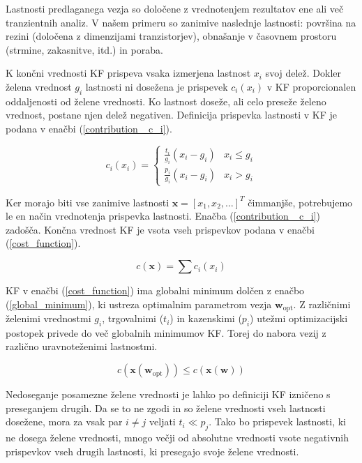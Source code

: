 \documentclass[journal,a4paper,twoside]{sty/IEEEtran}
\begin{document}
Lastnosti predlaganega vezja so določene z vrednotenjem rezultatov ene ali več tranzientnih analiz. V našem primeru so zanimive naslednje lastnosti: površina na rezini (določena z dimenzijami tranzistorjev), obnašanje v časovnem prostoru (strmine, zakasnitve, itd.) in poraba.

K končni vrednosti KF prispeva vsaka izmerjena lastnost $x_i$ svoj delež. Dokler želena vrednost $g_i$ lastnosti ni dosežena je prispevek $c_i(x_i)$ v KF proporcionalen oddaljenosti od želene vrednosti. Ko lastnost doseže, ali celo preseže želeno vrednost, postane njen delež negativen. Definicija prispevka lastnosti v KF je podana v enačbi (\ref{contribution _c_i}).

\begin{equation}
	\label{contribution _c_i}
	c_i(x_i) =
	\left\{
		\begin{array}{ll}
			\frac{t_i}{g_i} (x_i - g_i) & x_i \le g_i \\
			\frac{p_i}{g_i} (x_i - g_i) & x_i > g_i
		\end{array}
	\right.
\end{equation}

Ker morajo biti vse zanimive lastnosti $\mathbf{x} = [x_1, x_2, \ldots]^T$ čimmanjše, potrebujemo le en način vrednotenja prispevka lastnosti. Enačba (\ref{contribution _c_i}) zadošča. Končna vrednost KF je vsota vseh prispevkov podana v enačbi (\ref{cost_function}).

\begin{equation}
	\label{cost_function}
	c(\mathbf{x}) = \sum c_i(x_i)
\end{equation}

KF v enačbi (\ref{cost_function}) ima globalni minimum dolčen z enačbo (\ref{global_minimum}), ki ustreza optimalnim parametrom vezja $\mathbf{w}_\mathrm{opt}$. Z različnimi želenimi vrednostmi $g_i$, trgovalnimi ($t_i$) in kazenskimi ($p_i$) utežmi optimizacijski postopek privede do več globalnih minimumov KF. Torej do nabora vezij z različno uravnoteženimi lastnostmi.

\begin{equation}
	\label{global_minimum}
	c(\mathbf{x}(\mathbf{w}_\mathrm{opt})) \le c(\mathbf{x}(\mathbf{w}))
\end{equation}

Nedoseganje posamezne želene vrednosti je lahko po definiciji KF izničeno s preseganjem drugih. Da se to ne zgodi in so želene vrednosti vseh lastnosti dosežene, mora za vsak par $i \ne j$ veljati $t_i \ll p_j$. Tako bo prispevek lastnosti, ki ne dosega želene vrednosti, mnogo večji od absolutne vrednosti vsote negativnih prispevkov vseh drugih lastnosti, ki presegajo svoje želene vrednosti.
\end{document}
